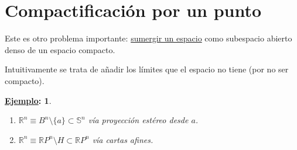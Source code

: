 \documentclass[10pt,a4paper,openright]{book}
\theoremstyle{break}
\newtheorem*{ej}{\underline{Ejemplo}:}
\begin{document}
\section{Compactificación por un punto}%
\label{sec:compactificacion_por_un_punto}
Este es otro problema importante: \underline{sumergir un espacio} como subespacio abierto denso de un espacio compacto.

Intuitivamente se trata de añadir los límites que el espacio no tiene (por no ser compacto).

\begin{ej}
\begin{enumerate}
    \item $\mathbb{R}^n \equiv B^n \setminus \{a\} \subset \mathbb{S}^n$ vía proyección estéreo desde $a$.
    \item $\mathbb{R}^n \equiv \mathbb{R}P^n \setminus H \subset \mathbb{R}P^n$ vía cartas afines.
\end{enumerate}
\end{ej}
\end{document}
